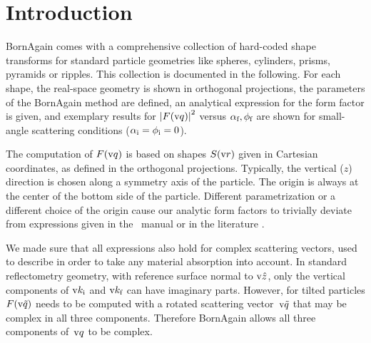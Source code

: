 
\def\ffsection#1{%
\FloatBarrier\clearpage
\section{#1}}

\makeatletter
\renewcommand{\@thesubfigure}{\relax}
\makeatother

\chapter{Introduction}\label{SPFF}


BornAgain comes with a comprehensive collection of hard-coded
shape transforms for standard particle geometries like
spheres, cylinders, prisms, pyramids or ripples.
This collection is documented in the following.
For each shape,
the real-space geometry is shown in orthogonal projections,
the parameters of the BornAgain method are defined,
an analytical expression for the form factor is given,
and exemplary results for $\left|F(\q)\right|^2$ versus
$\alpha_\sf,\phi_\sf$ are shown for small-angle scattering conditions
($\alpha_\si=\phi_\si=0$).

The computation of $F(\q)$ is based on
shapes $S(\r)$ given in Cartesian coordinates,
as defined in the orthogonal projections.
Typically, the vertical ($z$) direction is chosen
along a symmetry axis of the particle.
The origin is always at the center of the bottom side of the particle.
Different parametrization or a different choice of the origin
cause our analytic form factors to trivially deviate
from expressions given in the \IsGISAXS\ manual \cite[Sec.~2.3]{Laz06}
or in the literature \cite[Appendix]{ReLL09}.

We made sure that all expressions also hold for complex scattering vectors,
used to describe in order to take any material absorption into account.
In standard reflectometry geometry, with reference surface normal to $\v{\hat z}$,
only the vertical components of $\k_\si$ and $\k_\sf$ can have imaginary parts.
However,
for tilted particles
$F(\v{\tilde{q}})$ needs to be computed with
a rotated scattering vector~$\v{\tilde q}$
that may be complex in all three components.
Therefore BornAgain allows all three components of~$\q$ to be complex.

